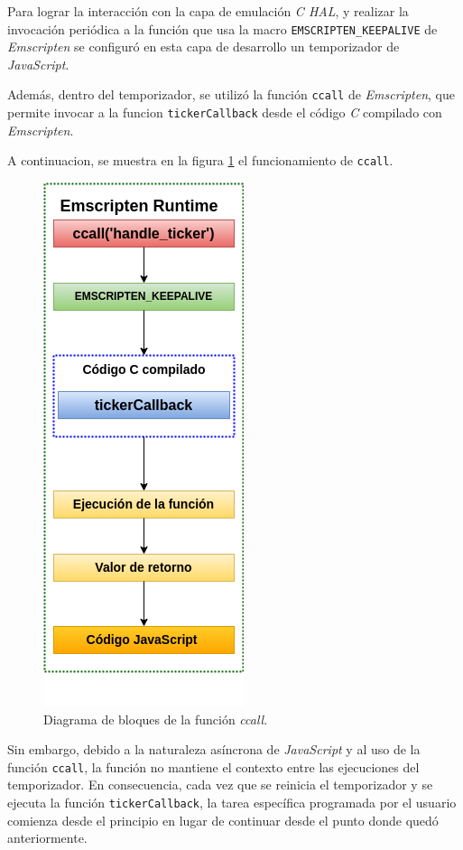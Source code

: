 Para lograr la interacción con la capa de emulación \textit{C HAL}, y realizar la invocación periódica a la función que usa la macro \texttt{EMSCRIPTEN\_KEEPALIVE} de \textit{Emscripten} se configuró en esta capa de desarrollo un temporizador de \textit{JavaScript}.

Además, dentro del temporizador, se utilizó la función \texttt{ccall} de \textit{Emscripten}, que permite invocar a la funcion \texttt{tickerCallback} desde el código \textit{C} compilado con \textit{Emscripten}. 

A continuacion, se muestra en la figura  \ref{fig:ccall} el funcionamiento de \texttt{ccall}. 

\hfill \break
\hfill \break
\hfill \break
\hfill \break

\begin{figure}[ht]
	\centering
	\includegraphics[scale=.49]{./Figures/ccall.png}
	\caption{Diagrama de bloques de la función \textit{ccall}.}
	\label{fig:ccall}
\end{figure}

Sin embargo, debido a la naturaleza asíncrona de \textit{JavaScript} y al uso de la función \texttt{ccall}, la función no mantiene el contexto entre las ejecuciones del temporizador. En consecuencia, cada vez que se reinicia el temporizador y se ejecuta la función  \texttt{tickerCallback}, la tarea específica programada por el usuario comienza desde el principio en lugar de continuar desde el punto donde quedó anteriormente. 

